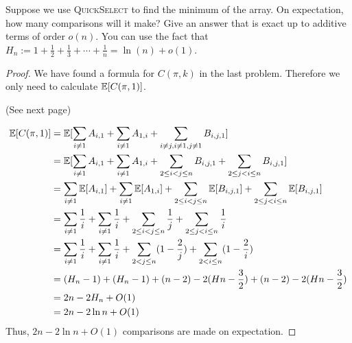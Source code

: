 \documentclass[11pt,a4paper,oneside]{article}
\newcommand{\E}{\mathop{\mathbb{E\/}}}
\begin{document}
\begin{problem}{8}
\statement
Suppose we use \textsc{QuickSelect} to find the minimum of the array. On expectation,
how many comparisons will it make? Give an answer that is exact up to additive terms 
of order $o(n)$.
You can use the fact that $H_n := 1 + \frac{1}{2} + \frac{1}{3} + \cdots  + \frac{1}{n} = \ln(n) + o(1)$.
\solution
\begin{proof}
	We have found a formula for $C(\pi,k)$ in the last problem. Therefore we only need to calculate $\E[C(\pi,1)]$.

	(See next page)

    \[
        \begin{split}
            \E[C(\pi,1)] &= \E[\sum_{i \not= 1}A_{i, 1} + \sum_{i \not= 1}A_{1, i} + \sum_{i \not= j, i \not= 1,j \not= 1}B_{i, j, 1}]\\
            &= \E[\sum_{i \not= 1}A_{i, 1} + \sum_{i \not= 1}A_{1, i} + \sum_{2 \leq i < j \leq n}B_{i, j, 1} + \sum_{2 \leq j < i \leq n}B_{i, j, 1}]\\
            &= \sum_{i \not= 1} \E[A_{i, 1}] + \sum_{i \not= 1} \E[A_{1, i}] + \sum_{2 \leq i < j \leq n}\E[B_{i, j, 1}] + \sum_{2 \leq j < i \leq n}\E[B_{i, j, 1}]\\
            &= \sum_{i \not= 1} \frac{1}{i} + \sum_{i \not= 1} \frac{1}{i} + \sum_{2 \leq i < j \leq n} \frac{1}{j} + \sum_{2 \leq j < i \leq n}\frac{1}{i}\\
            &= \sum_{i \not= 1} \frac{1}{i} + \sum_{i \not= 1} \frac{1}{i} + \sum_{2 < j \leq n}(1 - \frac{2}{j}) + \sum_{2 < i \leq n}(1 - \frac{2}{i})\\
            &= (H_n - 1) + (H_n - 1) + (n - 2) - 2(Hn - \frac{3}{2}) + (n - 2) - 2(Hn - \frac{3}{2})\\
			&= 2n - 2H_n + O(1) \\
			&= 2n - 2\ln n + O(1)
        \end{split}
    \]
    Thus, $2n - 2\ln n + O(1)$ comparisons are made on expectation.
\end{proof}
\end{problem}
\end{document}
